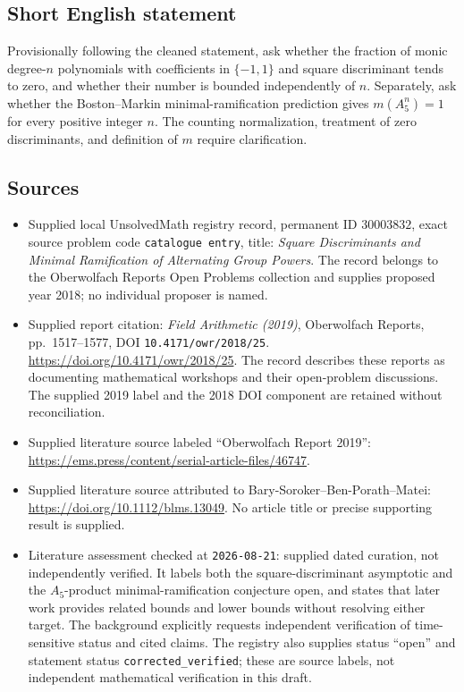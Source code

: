 \documentclass[11pt]{article}
\begin{document}
\subsection{Short English statement}
Provisionally following the cleaned statement, ask whether the fraction of monic degree-\(n\) polynomials with coefficients in \(\{-1,1\}\) and square discriminant tends to zero, and whether their number is bounded independently of \(n\). Separately, ask whether the Boston--Markin minimal-ramification prediction gives \(m(A_5^n)=1\) for every positive integer \(n\). The counting normalization, treatment of zero discriminants, and definition of \(m\) require clarification.
\subsection{Sources}
\begin{itemize}
\item Supplied local UnsolvedMath registry record, permanent ID \(30003832\), exact source problem code \texttt{catalogue entry}, title: \emph{Square Discriminants and Minimal Ramification of Alternating Group Powers}. The record belongs to the Oberwolfach Reports Open Problems collection and supplies proposed year 2018; no individual proposer is named.
\item Supplied report citation: \emph{Field Arithmetic (2019)}, Oberwolfach Reports, pp.\ 1517--1577, DOI \texttt{10.4171/owr/2018/25}. \url{https://doi.org/10.4171/owr/2018/25}. The record describes these reports as documenting mathematical workshops and their open-problem discussions. The supplied 2019 label and the 2018 DOI component are retained without reconciliation.
\item Supplied literature source labeled ``Oberwolfach Report 2019'': \url{https://ems.press/content/serial-article-files/46747}.
\item Supplied literature source attributed to Bary-Soroker--Ben-Porath--Matei: \url{https://doi.org/10.1112/blms.13049}. No article title or precise supporting result is supplied.
\item Literature assessment checked at \texttt{2026-08-21}: supplied dated curation, not independently verified. It labels both the square-discriminant asymptotic and the \(A_5\)-product minimal-ramification conjecture open, and states that later work provides related bounds and lower bounds without resolving either target. The background explicitly requests independent verification of time-sensitive status and cited claims. The registry also supplies status ``open'' and statement status \texttt{corrected\_verified}; these are source labels, not independent mathematical verification in this draft.
\end{itemize}
\end{document}
